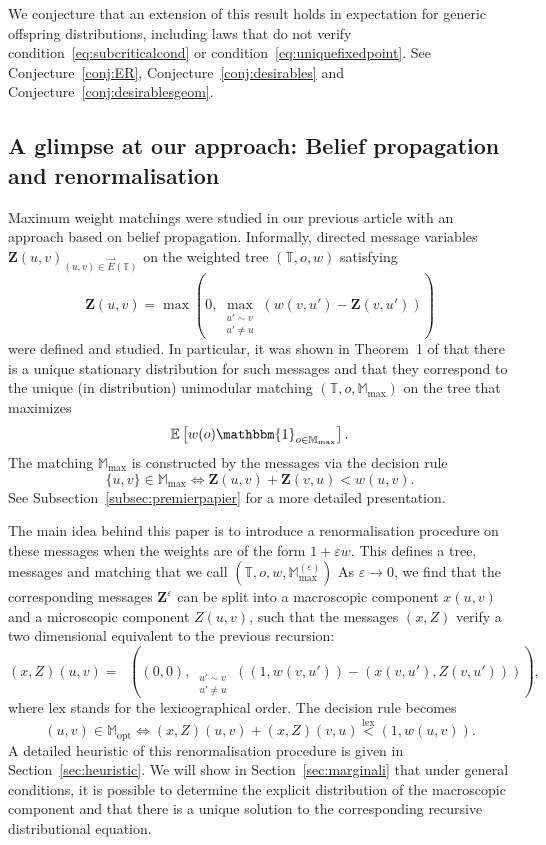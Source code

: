 \documentclass[11pt]{article}
\DeclareMathOperator{\lex}{lex}
\DeclareMathOperator*{\maxlex}{\overset{\lex}{\max}}
\newcommand{\eps}{\varepsilon}
\begin{document}
We conjecture that an extension of this result holds in expectation for generic offspring distributions, including laws that do not verify condition~\ref{eq:subcriticalcond} or condition~\ref{eq:uniquefixedpoint}. See Conjecture~\ref{conj:ER}, Conjecture~\ref{conj:desirables} and Conjecture~\ref{conj:desirablesgeom}.


\subsection{A glimpse at our approach: Belief propagation and renormalisation}
Maximum weight matchings were studied in our previous article \cite{enriquez2024optimalunimodularmatching} with an approach based on belief propagation. Informally, directed message variables $\mathbf{Z}(u,v)_{(u,v) \in \overset{\rightarrow}{E}(\mathbb{T})}$ on the weighted tree $(\mathbb{T},o,w)$ satisfying
\[ \mathbf{Z}(u,v)=\max\left(0,\max_{\substack{u' \sim v \\ u' \neq u}} \left( w(v,u')-\mathbf{Z}(v,u') \right)\right)  \] 
were defined and studied. In particular, it was shown in Theorem~1 of \cite{enriquez2024optimalunimodularmatching} that there is a unique stationary distribution for such messages and that they correspond to the unique (in distribution) unimodular matching $(\mathbb{T},o,\mathbb{M}_{\max})$ on the tree that maximizes
\[
\mathbb E \left[ w(o) \mathbbm{1}_{o \in \mathbb M_{\mathrm{max}}} \right].
\]
The matching $\mathbb M_{\mathrm{max}}$ is constructed by the messages via the decision rule
\[
\{u,v\} \in \mathbb{M}_{\max} \Leftrightarrow \mathbf{Z}(u,v) + \mathbf{Z}(v,u) < w(u,v).
\]
See Subsection~\ref{subsec:premierpapier} for a more detailed presentation.

The main idea behind this paper is to introduce a renormalisation procedure on these messages when the weights are of the form $1+\eps w$. This defines a tree, messages and matching that we call $(\mathbb{T},o,w,\mathbb{M}_{\max}^{(\eps)})$ As $\eps \rightarrow 0$, we find that the corresponding messages $\mathbf{Z}^{\eps}$ can be split into a macroscopic component $x(u,v)$ and a microscopic component $Z(u,v)$, such that the messages $(x,Z)$ verify a two dimensional equivalent to the previous recursion:
\[(x,Z)(u,v)=\maxlex \left( (0,0), \maxlex_{ \substack{u' \sim v \\ u' \neq u}} \left( (1,w(v,u'))-(x(v,u'),Z(v,u')) \right) \right),   \]
where $\mathrm{lex}$ stands for the lexicographical order. The decision rule becomes
\begin{equation*}
    (u,v) \in \mathbb{M}_{\mathrm{opt}} \Leftrightarrow (x,Z)(u,v)+(x,Z)(v,u) \overset{\mathrm{\lex}}{<} (1,w(u,v)).
\end{equation*}
A detailed heuristic of this renormalisation procedure is given in Section~\ref{sec:heuristic}.
We will show in Section~\ref{sec:marginali} that under general conditions, it is possible to determine the explicit distribution of the macroscopic component and that there is a unique solution to the corresponding recursive distributional equation.
\end{document}
